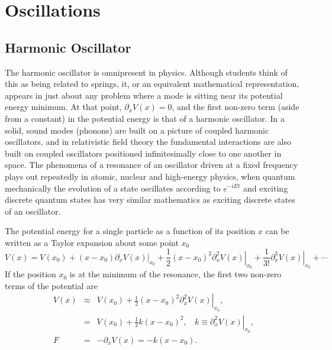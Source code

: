 \section{Oscillations}
\bigskip

\subsection{Harmonic Oscillator}

The harmonic oscillator is omnipresent in physics. Although students think of this as being related to springs, it, or an equivalent mathematical representation, appears in just about any problem where a mode is sitting near its potential energy minimum. At that point, $\partial_x V(x)=0$, and the first non-zero term (aside from a constant) in the potential energy is that of a harmonic oscillator. In a solid, sound modes (phonons) are built on a picture of coupled harmonic oscillators, and in relativistic field theory the fundamental interactions are also built on coupled oscillators positioned infinitesimally close to one another in space. The phenomena of a resonance of an oscillator driven at a fixed frequency plays out repeatedly in atomic, nuclear and high-energy physics, when quantum mechanically the evolution of a state oscillates according to $e^{-iEt}$ and exciting discrete quantum states has very similar mathematics as exciting discrete states of an oscillator.

The potential energy for a single particle as a function of its position $x$ can be written as a Taylor expansion about some point $x_0$
\begin{equation}
V(x)=V(x_0)+(x-x_0)\left.\partial_xV(x)\right|_{x_0}+\frac{1}{2}(x-x_0)^2\left.\partial_x^2V(x)\right|_{x_0}
+\frac{1}{3!}\left.\partial_x^3V(x)\right|_{x_0}+\cdots
\end{equation}
If the position $x_0$ is at the minimum of the resonance, the first two non-zero terms of the potential are
\begin{eqnarray}
V(x)&\approx& V(x_0)+\frac{1}{2}(x-x_0)^2\left.\partial_x^2V(x)\right|_{x_0},\\
\nonumber
&=&V(x_0)+\frac{1}{2}k(x-x_0)^2,~~~~k\equiv \left.\partial_x^2V(x)\right|_{x_0},\\
\nonumber
F&=&-\partial_xV(x)=-k(x-x_0).
\end{eqnarray}

